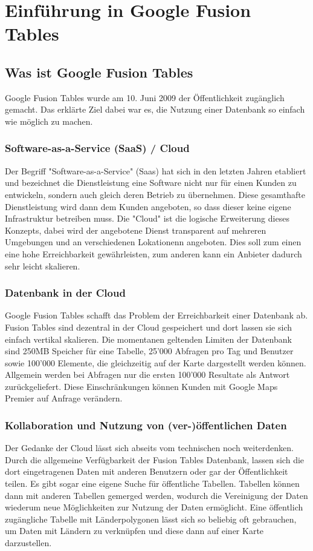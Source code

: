 \chapter{Einführung in Google Fusion Tables}

\section{Was ist Google Fusion Tables}
Google Fusion Tables wurde am 10. Juni 2009 der Öffentlichkeit zugänglich gemacht\cite{fusion-table-announce}. Das erklärte Ziel dabei war es, die Nutzung einer Datenbank so einfach wie möglich zu machen.

\subsection{Software-as-a-Service (SaaS) / Cloud}
Der Begriff "Software-as-a-Service" (Saas) hat sich in den letzten Jahren etabliert und bezeichnet die Dienstleistung eine Software nicht nur für einen Kunden zu entwickeln, sondern auch gleich deren Betrieb zu übernehmen. Diese gesamthafte Dienstleistung wird dann dem Kunden angeboten, so dass dieser keine eigene Infrastruktur betreiben muss. Die "Cloud" ist die logische  Erweiterung dieses Konzepts, dabei wird der angebotene Dienst transparent auf mehreren Umgebungen und an verschiedenen Lokationenn angeboten. Dies soll zum einen eine hohe Erreichbarkeit gewährleisten, zum anderen kann ein Anbieter dadurch sehr leicht skalieren. 

\subsection{Datenbank in der Cloud}
Google Fusion Tables schafft das Problem der Erreichbarkeit einer Datenbank ab. Fusion Tables sind dezentral in der Cloud gespeichert und dort lassen sie sich einfach vertikal skalieren. Die momentanen geltenden Limiten der Datenbank sind 250MB Speicher für eine Tabelle, 25'000 Abfragen pro Tag und Benutzer sowie 100'000 Elemente, die gleichzeitig auf der Karte dargestellt werden können. Allgemein werden bei Abfragen nur die ersten 100'000 Resultate als Antwort zurückgeliefert. Diese Einschränkungen können Kunden mit Google Maps Premier auf Anfrage verändern. \cite{fusion-tables-geo-limits}

\subsection{Kollaboration und Nutzung von (ver-)öffentlichen Daten}
Der Gedanke der Cloud lässt sich abseits vom technischen noch weiterdenken. Durch die allgemeine Verfügbarkeit der Fusion Tables Datenbank, lassen sich die dort eingetragenen Daten mit anderen Benutzern oder gar der Öffentlichkeit teilen. Es gibt sogar eine eigene Suche für öffentliche Tabellen.\cite{fusion-tables-search} Tabellen können dann mit anderen Tabellen gemerged werden, wodurch die Vereinigung der Daten wiederum neue Möglichkeiten zur Nutzung der Daten ermöglicht. Eine öffentlich zugängliche Tabelle mit Länderpolygonen lässt sich so beliebig oft gebrauchen, um Daten mit Ländern zu verknüpfen und diese dann auf einer Karte darzustellen.

